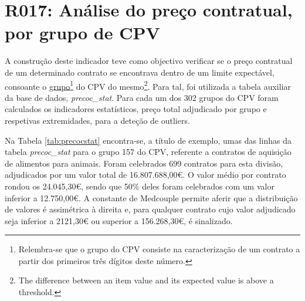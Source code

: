 \section{R017: Análise do preço contratual, por grupo de CPV}


A construção deste indicador teve como objectivo verificar se o preço contratual de um determinado contrato se encontrava dentro de um limite expectável, consoante o \hyperref[sec:cepeves]{grupo\footnote{Relembra-se que o grupo do CPV consiste na caracterização de um contrato a partir dos primeiros três dígitos deste número.} do CPV} do mesmo\footnote{The difference between an item value and its expected value is above a threshold.}. Para tal, foi utilizada a tabela auxiliar da base de dados, \textit{precoc\_stat}. Para cada um dos 302 grupos do CPV foram calculados os indicadores estatísticos, preço total adjudicado por grupo e respetivas extremidades, para a deteção de outliers.

Na Tabela \ref{tab:precocstat} encontra-se, a título de exemplo, umas das linhas da tabela \textit{precoc\_stat} para o grupo 157 do CPV, referente a contratos de aquisição de alimentos para animais. Foram celebrados 699 contratos para esta divisão, adjudicados por um valor total de 16.807.688,00€. O valor médio por contrato rondou os 24.045,30€, sendo que 50\% deles foram celebrados com um valor inferior a 12.750,00€. A constante de Medcouple permite aferir que a distribuição de valores é assimétrica à direita e, para qualquer contrato cujo valor adjudicado seja inferior a 2121,30€ ou superior a 156.268,30€, é sinalizado.

\begin{table}[H]
	\centering
	\renewcommand{\arraystretch}{1.4}
	\caption{Exemplo de uma linha da tabela \textit{precoc\_stat} para concursos públicos referentes a aquisição de alimentos para animais.}
	\label{tab:precocstat}	
\end{table}




